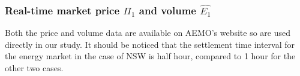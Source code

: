 \subsubsection{Real-time market price $\Pi_1$ and volume $\hat{E_1}$}

Both the price and volume data are available on AEMO's website so are used directly in our study. It should be noticed that the settlement time interval for the energy market in the case of NSW is half hour, compared to 1 hour for the other two cases.










